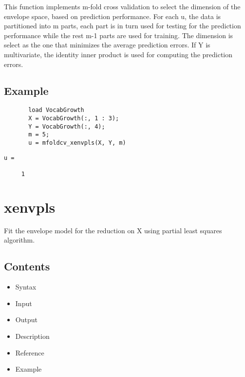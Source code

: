 \documentclass[a4paper,11pt,openany]{memoir}
\begin{document}
\begin{par}
This function implements m-fold cross validation to select the dimension of the envelope space, based on prediction performance.  For each u, the data is partitioned into m parts, each part is in turn used for testing for the prediction performance while the rest m-1 parts are used for training.  The dimension is select as the one that minimizes the average prediction errors. If Y is multivariate, the identity inner product is used for computing the prediction errors.
\end{par} \vspace{1em}


\subsection*{Example}


\begin{verbatim}       load VocabGrowth
       X = VocabGrowth(:, 1 : 3);
       Y = VocabGrowth(:, 4);
       m = 5;
       u = mfoldcv_xenvpls(X, Y, m)\end{verbatim}
           
        \color{lightgray} \ttfamily\begin{verbatim}
u =

     1

\end{verbatim} \rmfamily\color{black}

\newpage

\rmfamily
\color{black}\section{xenvpls}

\begin{par}
Fit the envelope model for the reduction on X using partial least squares algorithm.
\end{par} \vspace{1em}

\subsection*{Contents}

\begin{itemize}
\setlength{\itemsep}{-1ex}
   \item Syntax
   \item Input
   \item Output
   \item Description
   \item Reference
   \item Example
\end{itemize}
\end{document}
